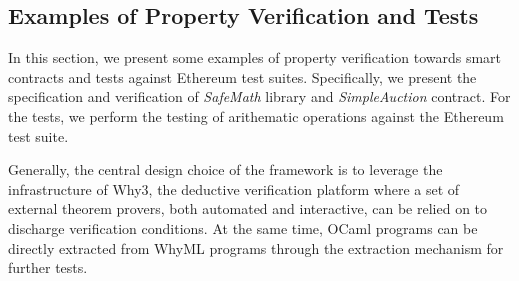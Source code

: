 \documentclass[runningheads]{llncs}
\newcommand {\xy} {\color{purple}}
\begin{document}
\subsection{Examples of Property Verification and Tests}
{\xy
In this section, we present some examples of property verification towards smart contracts and tests against Ethereum 
test suites. 
Specifically, we present the specification and verification of \emph{SafeMath} library and \emph{SimpleAuction} contract.
For the tests, we perform the testing of arithematic operations against the Ethereum test suite.

Generally, the central design choice of the framework is to leverage the infrastructure of 
Why3, the deductive verification platform where a set of external theorem provers, both automated and interactive, 
can be relied on to discharge verification conditions. At the same time, 
OCaml programs can be directly extracted from WhyML programs through the extraction mechanism for further tests.
}
\end{document}
